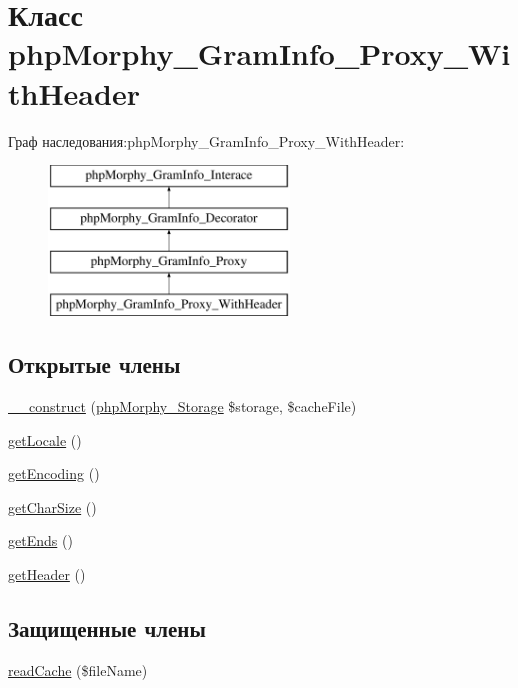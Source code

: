 \hypertarget{classphpMorphy__GramInfo__Proxy__WithHeader}{
\section{Класс phpMorphy\_\-GramInfo\_\-Proxy\_\-WithHeader}
\label{classphpMorphy__GramInfo__Proxy__WithHeader}
}
Граф наследования:phpMorphy\_\-GramInfo\_\-Proxy\_\-WithHeader:\begin{figure}[H]
\begin{center}
\leavevmode
\includegraphics[height=4.000000cm]{classphpMorphy__GramInfo__Proxy__WithHeader}
\end{center}
\end{figure}
\subsection*{Открытые члены}
\begin{DoxyCompactItemize}
\item 
\hyperlink{classphpMorphy__GramInfo__Proxy__WithHeader_ae8c3e6b596538b6349d08431abf0a1f6}{\_\-\_\-construct} (\hyperlink{classphpMorphy__Storage}{phpMorphy\_\-Storage} \$storage, \$cacheFile)
\item 
\hyperlink{classphpMorphy__GramInfo__Proxy__WithHeader_a8b5b6ea4f69358c419527a94eb94a89c}{getLocale} ()
\item 
\hyperlink{classphpMorphy__GramInfo__Proxy__WithHeader_a24e8ccac85536cf68f8314bb8f0fc74a}{getEncoding} ()
\item 
\hyperlink{classphpMorphy__GramInfo__Proxy__WithHeader_a776d157c84d450ddb0a41e4def4f11e2}{getCharSize} ()
\item 
\hyperlink{classphpMorphy__GramInfo__Proxy__WithHeader_a689b3799cc2f901b8c9d384189051581}{getEnds} ()
\item 
\hyperlink{classphpMorphy__GramInfo__Proxy__WithHeader_affbe11ec5e1e9685b36de753994a9821}{getHeader} ()
\end{DoxyCompactItemize}
\subsection*{Защищенные члены}
\begin{DoxyCompactItemize}
\item 
\hyperlink{classphpMorphy__GramInfo__Proxy__WithHeader_a8fd24c862bca9475836b32485f5ca797}{readCache} (\$fileName)
\end{DoxyCompactItemize}
